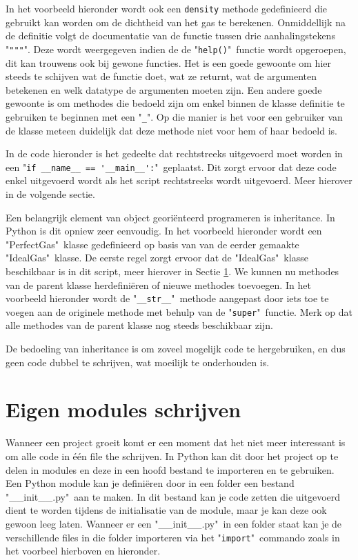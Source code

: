 \documentclass[11pt,twoside]{article}
\begin{document}
In het voorbeeld hieronder wordt ook een \lstinline{density} methode gedefinieerd die gebruikt kan worden om de dichtheid van het gas te berekenen. Onmiddellijk na de definitie volgt de documentatie van de functie tussen drie aanhalingstekens "\lstinline{"""}". Deze wordt weergegeven indien de de "\lstinline{help()}"\ functie wordt opgeroepen, dit kan trouwens ook bij gewone functies. Het is een goede gewoonte om hier steeds te schijven wat de functie doet, wat ze returnt, wat de argumenten betekenen en welk datatype de argumenten moeten zijn. Een andere goede gewoonte is om methodes die bedoeld zijn om enkel binnen de klasse definitie te gebruiken te beginnen met een "\lstinline{_}". Op die manier is het voor een gebruiker van de klasse meteen duidelijk dat deze methode niet voor hem of haar bedoeld is. 

In de code hieronder is het gedeelte dat rechtstreeks uitgevoerd moet worden in een "\lstinline{if __name__ == '__main__':}"\ geplaatst. Dit zorgt ervoor dat deze code enkel uitgevoerd wordt als het script rechtstreeks wordt uitgevoerd. Meer hierover in de volgende sectie.


Een belangrijk element van object georiënteerd programeren is inheritance. In Python is dit opniew zeer eenvoudig. In het voorbeeld hieronder wordt een "PerfectGas"\ klasse gedefinieerd op basis van van de eerder gemaakte "IdealGas"\ klasse. De eerste regel zorgt ervoor dat de "IdealGas"\ klasse beschikbaar is in dit script, meer hierover in Sectie \ref{sec:Eigen modules schrijven}. We kunnen nu methodes van de parent klasse herdefiniëren of nieuwe methodes toevoegen. In het voorbeeld hieronder wordt de "\lstinline{__str__}"\ methode aangepast door iets toe te voegen aan de originele methode met behulp van de "\lstinline{super}"\ functie. Merk op dat alle methodes van de parent klasse nog steeds beschikbaar zijn.

	
De bedoeling van inheritance is om zoveel mogelijk code te hergebruiken, en dus geen code dubbel te schrijven, wat moeilijk te onderhouden is.

 	\section{Eigen modules schrijven}
 	\label{sec:Eigen modules schrijven}
Wanneer een project groeit komt er een moment dat het niet meer interessant is om alle code in één file the schrijven. In Python kan dit door het project op te delen in modules en deze in een hoofd bestand te importeren en te gebruiken. Een Python module kan je definiëren door in een folder een bestand "\textsf{\_\_init\_\_.py}"\ aan te maken. In dit bestand kan je code zetten die uitgevoerd dient te worden tijdens de initialisatie van de module, maar je kan deze ook gewoon leeg laten. Wanneer er een "\textsf{\_\_init\_\_.py}"\ in een folder staat kan je de verschillende files in die folder importeren via het "\lstinline{import}"\ commando zoals in het voorbeel hierboven en hieronder.
\end{document}
